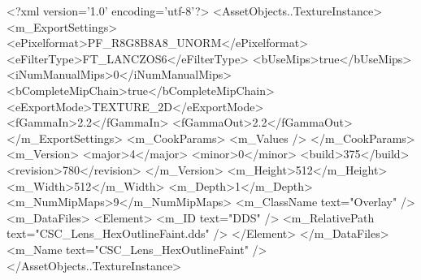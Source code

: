 <?xml version='1.0' encoding='utf-8'?>
<AssetObjects..TextureInstance>
  <m_ExportSettings>
    <ePixelformat>PF_R8G8B8A8_UNORM</ePixelformat>
    <eFilterType>FT_LANCZOS6</eFilterType>
    <bUseMips>true</bUseMips>
    <iNumManualMips>0</iNumManualMips>
    <bCompleteMipChain>true</bCompleteMipChain>
    <eExportMode>TEXTURE_2D</eExportMode>
    <fGammaIn>2.2</fGammaIn>
    <fGammaOut>2.2</fGammaOut>
  </m_ExportSettings>
  <m_CookParams>
    <m_Values />
  </m_CookParams>
  <m_Version>
    <major>4</major>
    <minor>0</minor>
    <build>375</build>
    <revision>780</revision>
  </m_Version>
  <m_Height>512</m_Height>
  <m_Width>512</m_Width>
  <m_Depth>1</m_Depth>
  <m_NumMipMaps>9</m_NumMipMaps>
  <m_ClassName text="Overlay" />
  <m_DataFiles>
    <Element>
      <m_ID text="DDS" />
      <m_RelativePath text="CSC_Lens_HexOutlineFaint.dds" />
    </Element>
  </m_DataFiles>
  <m_Name text="CSC_Lens_HexOutlineFaint" />
</AssetObjects..TextureInstance>

